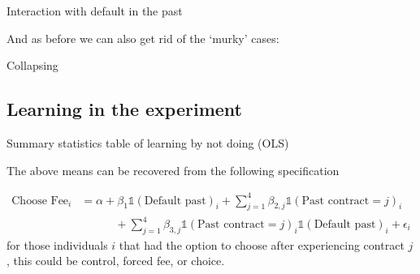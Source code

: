 \documentclass[oneside,11pt]{article}
\begin{document}
\begin{table}[H]
\caption{Interaction with default in the past}
\begin{center}
\scriptsize{}
\end{center}
 \scriptsize

\end{table}



And as before we can also get rid of the `murky' cases:






\begin{table}[H]
\caption{Collapsing}
\begin{center}
\scriptsize{}
\end{center}
 \scriptsize

\end{table}








\subsection{Learning in the experiment}


\begin{table}[H]
\caption{Summary statistics table of learning by not doing (OLS)}
\begin{center}
\scriptsize{}
\end{center}
 \scriptsize

\end{table}
 
The above means can be recovered from the following specification

\begin{align*}
    \text{Choose Fee}_{i} &=  \alpha +  \beta_1\mathds{1}(\text{Default past})_{i} +\sum_{j=1}^{4}\beta_{2,j}\mathds{1}(\text{Past contract}=j)_{i} \\
   &\qquad\quad  +\sum_{j=1}^{4}\beta_{3,j}\mathds{1}(\text{Past contract}=j)_{i}\mathds{1}(\text{Default past})_{i} + \epsilon_i
\end{align*}
for those individuals $i$ that had the option to choose after experiencing contract $j$, this could be control, forced fee, or choice. 
\end{document}
